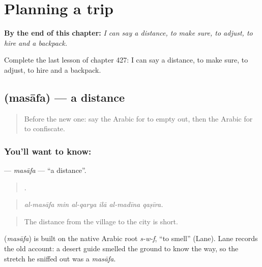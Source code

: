 
\chapter{Planning a trip}
\label{ch:ar-planning-a-trip}

\begin{chapteropening}
\textbf{By the end of this chapter:} \emph{I can say a distance, to make sure, to adjust, to hire and a backpack.}

Complete the last lesson of chapter 427: I can say a distance, to make sure, to adjust, to hire and a backpack.
\end{chapteropening}

\section[\texorpdfstring{\ar{مسافة} (masāfa)}{مسافة (masāfa)}]{ (masāfa) — a distance}

\label{lesson:AR-C427-masafa}



\begin{quote}
Before the new one: say the Arabic for to empty out, then the Arabic for to confiscate.
\end{quote}

\subsection*{You'll want to know: }
\textbf{} — \emph{masāfa} — \textquotedblleft{}a distance\textquotedblright{}.

\begin{quote}
     .
\end{quote}

\begin{quote}
\emph{al-masāfa min al-qarya ilā al-madīna qaṣīra.}
\end{quote}

\begin{quote}
The distance from the village to the city is short.
\end{quote}

\begin{cousinweb}
\textbf{} (\emph{masāfa}) is built on the native Arabic root \emph{s-w-f}, \textquotedblleft{}to smell\textquotedblright{} (Lane). Lane records the old account: a desert guide smelled the ground to know the way, so the stretch he sniffed out was a \emph{masāfa}.
\end{cousinweb}

